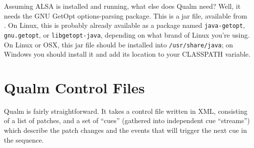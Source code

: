 \documentclass{article}
\newcommand{\q}{{\textsf{Qualm}}\xspace}
\newcommand{\code}[1]{{\tt #1}}
\begin{document}
Assuming ALSA is installed and running, what else does \q need?  Well,
it needs the GNU GetOpt options-parsing package.  This is a jar file,
available from .  On
Linux, this is probably already available as a package named
\code{java-getopt}, \code{gnu.getopt}, or \code{libgetopt-java},
depending on what brand of Linux you're using.  On Linux or OSX, this
jar file should be installed into \code{/usr/share/java}; on Windows
you should install it and add its location to your CLASSPATH variable.

\begin{latexonly}\newpage\end{latexonly}
\section{\q Control Files}

\q is fairly straightforward.  It takes a control file written in
XML, consisting of a list of patches, and a set of ``cues'' (gathered into
independent cue ``streams'') which describe the patch changes and the
events that will trigger the next cue in the sequence.
\end{document}
